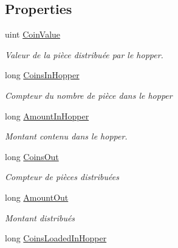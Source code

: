\subsection*{Properties}
\begin{DoxyCompactItemize}
\item 
uint \mbox{\hyperlink{class_device_library_1_1_c_hopper_a78903783271cadf2c222e983c46009f5}{Coin\+Value}}
\begin{DoxyCompactList}\small\item\em Valeur de la pièce distribuée par le hopper. \end{DoxyCompactList}\item 
long \mbox{\hyperlink{class_device_library_1_1_c_hopper_a3c755d041eabd52ba997d42822658f91}{Coins\+In\+Hopper}}
\begin{DoxyCompactList}\small\item\em Compteur du nombre de pièce dans le hopper \end{DoxyCompactList}\item 
long \mbox{\hyperlink{class_device_library_1_1_c_hopper_a0a7c83ec2bf3e3ac22e6585e6c0ff4ae}{Amount\+In\+Hopper}}
\begin{DoxyCompactList}\small\item\em Montant contenu dans le hopper. \end{DoxyCompactList}\item 
long \mbox{\hyperlink{class_device_library_1_1_c_hopper_ab6a5f0c6c2bfb253f65d75d0f7006e5f}{Coins\+Out}}
\begin{DoxyCompactList}\small\item\em Compteur de pièces distribuées \end{DoxyCompactList}\item 
long \mbox{\hyperlink{class_device_library_1_1_c_hopper_a341c4cee94631414e512d7edf2d3b2fc}{Amount\+Out}}
\begin{DoxyCompactList}\small\item\em Montant distribués \end{DoxyCompactList}\item 
long \mbox{\hyperlink{class_device_library_1_1_c_hopper_a5ace9c8caf38ba82416201a92908d426}{Coins\+Loaded\+In\+Hopper}}

\end{DoxyCompactItemize}
